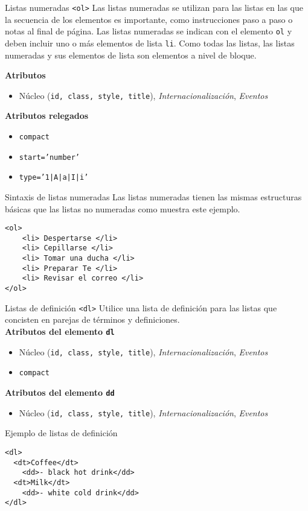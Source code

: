 \begin{frame}{Listas numeradas \texttt{<ol>}} %
    Las listas numeradas se utilizan para las listas en las que la secuencia de
    los elementos es importante, como instrucciones paso a paso o notas al
    final de página. Las listas numeradas se indican con el elemento
    \texttt{ol} y deben incluir uno o más elementos de lista \texttt{li}. Como
    todas las listas, las listas numeradas y sus elementos de lista son
    elementos a nivel de bloque. 

    \textbf{Atributos}
    \begin{itemize}
        \item Núcleo (\texttt{id, class, style, title}),
        \textit{Internacionalización},  \textit{Eventos}
    \end{itemize}

    \textbf{Atributos relegados}
    \begin{itemize}
        \item \texttt{compact}
        \item \texttt{start='number'}
        \item \texttt{type='1|A|a|I|i'}
    \end{itemize}
\end{frame}

\begin{frame}[fragile]{Sintaxis de listas numeradas} %
    Las listas numeradas tienen las mismas estructuras básicas que las listas no
    numeradas como muestra este ejemplo. 

    \begin{lstlisting}
<ol> 
    <li> Despertarse </li> 
    <li> Cepillarse </li>
    <li> Tomar una ducha </li> 
    <li> Preparar Te </li> 
    <li> Revisar el correo </li> 
</ol>
    \end{lstlisting}

\end{frame}

\begin{frame}{Listas de definición \texttt{<dl>}} %
   Utilice una lista de definición para las listas que concisten en parejas de
   términos y definiciones. \\[0.2cm]
    
   \textbf{Atributos del elemento \texttt{dl}}
   \begin{itemize}
       \item Núcleo (\texttt{id, class, style, title}),
       \textit{Internacionalización},  \textit{Eventos}
       \item \texttt{compact}
   \end{itemize}
   
   \textbf{Atributos del elemento \texttt{dd}}
   \begin{itemize}
       \item Núcleo (\texttt{id, class, style, title}),
       \textit{Internacionalización},  \textit{Eventos}
   \end{itemize}
\end{frame}


\begin{frame}[fragile]{Ejemplo de listas de definición} %
\begin{lstlisting}
<dl>
  <dt>Coffee</dt>
    <dd>- black hot drink</dd>
  <dt>Milk</dt>
    <dd>- white cold drink</dd>
</dl>
\end{lstlisting}
\end{frame}



